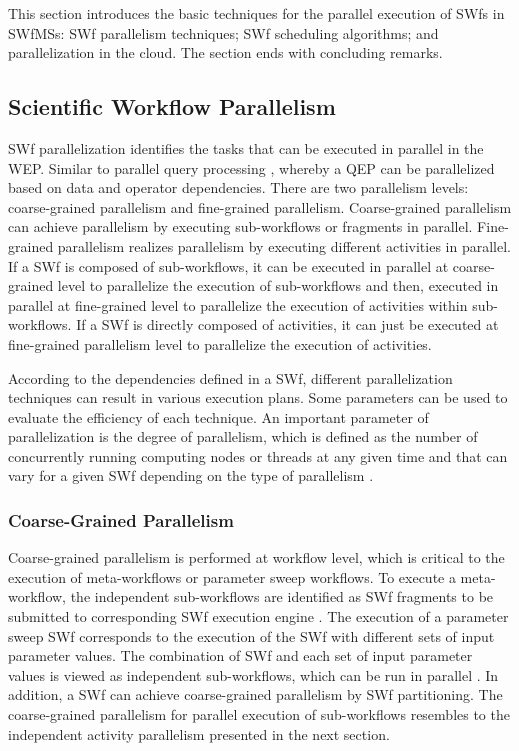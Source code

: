 This section introduces the basic techniques for the parallel execution of SWfs in SWfMSs: SWf parallelism techniques; SWf
scheduling algorithms; and parallelization in the cloud. The section ends with concluding remarks.


\subsection{Scientific Workflow Parallelism}
\label{sec:subsec:WP}

SWf parallelization identifies the tasks
that can be executed in parallel in the WEP.
Similar to parallel query processing \cite{Ozsu2011}, whereby
a QEP can be parallelized based on data and operator dependencies.
There are two parallelism levels: coarse-grained parallelism and fine-grained parallelism.
Coarse-grained parallelism can achieve parallelism by executing sub-workflows or fragments in parallel. Fine-grained parallelism realizes parallelism by executing different activities in parallel. If a SWf is composed of sub-workflows, it can be executed in parallel at coarse-grained level to parallelize the execution of sub-workflows and then, executed in parallel at fine-grained level to parallelize the execution of activities within sub-workflows. If a SWf is directly composed of activities, it can just be executed at fine-grained parallelism level to parallelize the execution of activities. 

According to the dependencies defined in a SWf, different
parallelization techniques can result in various execution plans.
Some parameters can be used to evaluate the efficiency of each technique.
An important parameter of parallelization is the degree of
parallelism, which is defined as the number of concurrently running computing nodes or threads
at any given time and that can vary for a given SWf depending
on the type of parallelism \cite{Bux2013}. 

\subsubsection{Coarse-Grained Parallelism}

Coarse-grained parallelism is performed at workflow level, which is critical to the execution of meta-workflows or parameter sweep workflows. To execute a meta-workflow, the independent sub-workflows  are identified as SWf fragments to be submitted to corresponding SWf execution engine \cite{Tersty2014}. The execution of a parameter sweep SWf corresponds to the execution of the SWf with different sets of input parameter values. The combination of SWf and each set of input parameter values is viewed as independent sub-workflows, which can be run in parallel \cite{Kacsuk2011}. In addition, a SWf can achieve coarse-grained parallelism by SWf partitioning. The coarse-grained parallelism for parallel execution of sub-workflows resembles to the independent activity parallelism presented in the next section.


